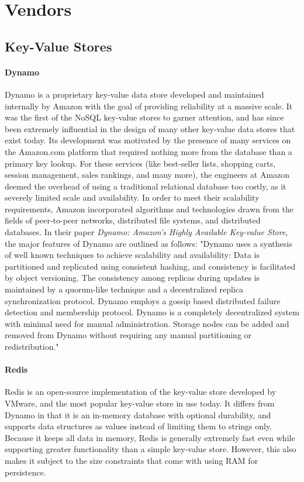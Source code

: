 \documentclass[11pt,a4paper]{report}
\begin{document}
\section{Vendors}
\subsection{Key-Value Stores}
\paragraph{Dynamo}
Dynamo is a proprietary key-value data store developed and maintained internally by Amazon with the goal of providing reliability at a massive scale.\cite{decandia2007dynamo} It was the first of the NoSQL key-value stores to garner attention, and has since been extremely influential in the design of many other key-value data stores that exist today.\cite{strauch2011nosql} Its development was motivated by the presence of many services on the Amazon.com platform that required nothing more from the database than a primary key lookup. For these services (like best-seller lists, shopping carts, session management, sales rankings, and many more), the engineers at Amazon deemed the overhead of using a traditional relational database too costly, as it severely limited scale and availability.\cite{decandia2007dynamo}  In order to meet their scalability requirements, Amazon incorporated algorithms and technologies drawn from the fields of peer-to-peer networks, distributed file systems, and distributed databases.\cite{orend2010analysis} In their paper \textit{Dynamo: Amazon's Highly Available Key-value Store}, the major features of Dynamo are outlined as follows:  "Dynamo uses a synthesis of well known techniques to achieve scalability and availability: Data is partitioned and replicated using consistent hashing, and consistency is facilitated by object versioning. The consistency among replicas during updates is maintained by a quorum-like technique and a decentralized replica synchronization protocol. Dynamo employs a gossip based distributed failure detection and membership protocol. Dynamo is a completely decentralized system with minimal need for manual administration. Storage nodes can be added and removed from Dynamo without requiring any manual partitioning or redistribution."\cite{decandia2007dynamo}

\paragraph{Redis}
Redis is an open-source implementation of the key-value store developed by VMware, and the most popular key-value store in use today.\cite{dbranking,paksulapersisting} It differs from Dynamo in that it is an in-memory database with optional durability, and supports data structures as values instead of limiting them to strings only. Because it keeps all data in memory, Redis is generally extremely fast even while supporting greater functionality than a simple key-value store. However, this also makes it subject to the size constraints that come with using RAM for persistence.\cite{paksulapersisting} 
\end{document}

